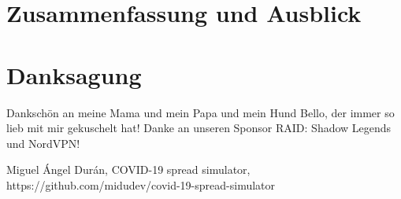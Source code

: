 \documentclass[conference]{IEEEtran}
\begin{document}
\section{Zusammenfassung und Ausblick}

\section*{Danksagung}

Dankschön an meine Mama und mein Papa und mein Hund Bello, der immer so lieb mit mir gekuschelt hat! Danke an unseren Sponsor
RAID: Shadow Legends und NordVPN!

\cite{b1}
\begin{thebibliography}{00}
 Miguel Ángel Durán, COVID-19 spread simulator, 
https://github.com/midudev/covid-19-spread-simulator
\end{thebibliography}
\vspace{12pt}
\end{document}
